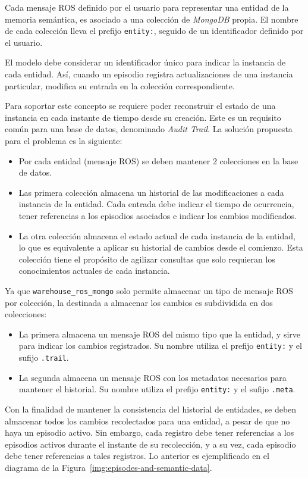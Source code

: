 Cada mensaje ROS definido por el usuario para representar una entidad de la memoria semántica, es asociado a una colección de \textit{MongoDB} propia. El nombre de cada colección lleva el prefijo \texttt{entity:}, seguido de un identificador definido por el usuario. 

El modelo debe considerar un identificador único para indicar la instancia de cada entidad. Así, cuando un episodio registra actualizaciones de una instancia particular, modifica su entrada en la colección correspondiente.

Para soportar este concepto se requiere poder reconstruir el estado de una instancia en cada instante de tiempo desde su creación. Este es un requisito común para una base de datos, denominado \textit{Audit Trail}. La solución propuesta para el problema es la siguiente:
\begin{itemize}
\item Por cada entidad (mensaje ROS) se deben mantener 2 colecciones en la base de datos.
\item Las primera colección almacena un historial de las modificaciones a cada instancia de la entidad. Cada entrada debe indicar el tiempo de ocurrencia, tener referencias a los episodios asociados e indicar los cambios modificados.
\item La otra colección almacena el estado actual de cada instancia de la entidad, lo que es equivalente a aplicar su historial de cambios desde el comienzo. Esta colección tiene el propósito de agilizar consultas que solo requieran los conocimientos actuales de cada instancia.
\end{itemize}
Ya que \texttt{warehouse\_ros\_mongo} solo permite almacenar un tipo de mensaje ROS por colección, la destinada a almacenar los cambios es subdividida en dos colecciones:
\begin{itemize}
\item La primera almacena un mensaje ROS del mismo tipo que la entidad, y sirve para indicar los cambios registrados. Su nombre utiliza el prefijo \texttt{entity:} y el sufijo \texttt{.trail}.
\item La segunda almacena un mensaje ROS con los metadatos necesarios para mantener el historial. Su nombre utiliza el prefijo \texttt{entity:} y el sufijo \texttt{.meta}.
\end{itemize}

Con la finalidad de mantener la consistencia del historial de entidades, se deben almacenar todos los cambios recolectados para una entidad, a pesar de que no haya un episodio activo. Sin embargo, cada registro debe tener referencias a los episodios activos durante el instante de su recolección, y a su vez, cada episodio debe tener referencias a tales registros. Lo anterior es ejemplificado en el diagrama de la Figura~\ref{img:episodes-and-semantic-data}.

